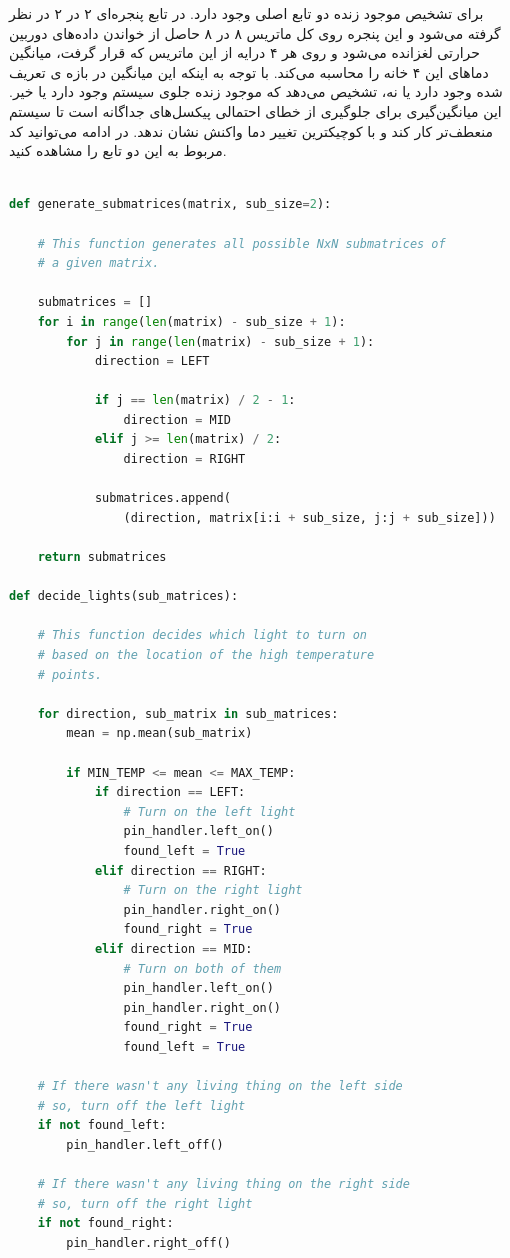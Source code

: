 برای تشخیص موجود زنده دو تابع اصلی وجود دارد. در تابع  پنجره‌ای ۲ در ۲ در نظر گرفته می‌شود و این پنجره روی کل ماتریس ۸ در ۸ حاصل از خواندن داده‌های دوربین حرارتی لغزانده می‌شود و روی هر ۴ درایه‌ از این ماتریس که قرار گرفت، میانگین دماهای این ۴ خانه را محاسبه می‌کند. با توجه به اینکه این میانگین در بازه ی تعریف شده وجود دارد یا نه، تشخیص می‌دهد که موجود زنده‌ جلوی سیستم وجود دارد یا خیر. این میانگین‌گیری برای جلوگیری از خطای احتمالی پیکسل‌های جداگانه است تا سیستم منعطف‌تر کار کند و با کوچیکترین تغییر دما واکنش نشان ندهد.
در ادامه می‌توانید کد مربوط به این دو تابع را مشاهده کنید.

\begin{latin}
\begin{lstlisting}[language=python]

def generate_submatrices(matrix, sub_size=2):

    # This function generates all possible NxN submatrices of
    # a given matrix.

    submatrices = []
    for i in range(len(matrix) - sub_size + 1):
        for j in range(len(matrix) - sub_size + 1):
            direction = LEFT

            if j == len(matrix) / 2 - 1:
                direction = MID
            elif j >= len(matrix) / 2:
                direction = RIGHT

            submatrices.append(
                (direction, matrix[i:i + sub_size, j:j + sub_size]))

    return submatrices

def decide_lights(sub_matrices):

    # This function decides which light to turn on
    # based on the location of the high temperature
    # points.

    for direction, sub_matrix in sub_matrices:
        mean = np.mean(sub_matrix)

        if MIN_TEMP <= mean <= MAX_TEMP:
            if direction == LEFT:
                # Turn on the left light
                pin_handler.left_on()
                found_left = True
            elif direction == RIGHT:
                # Turn on the right light
                pin_handler.right_on()
                found_right = True
            elif direction == MID:
                # Turn on both of them
                pin_handler.left_on()
                pin_handler.right_on()
                found_right = True
                found_left = True

    # If there wasn't any living thing on the left side
    # so, turn off the left light
    if not found_left:
        pin_handler.left_off()

    # If there wasn't any living thing on the right side
    # so, turn off the right light
    if not found_right:
        pin_handler.right_off()


\end{lstlisting}
\end{latin}

